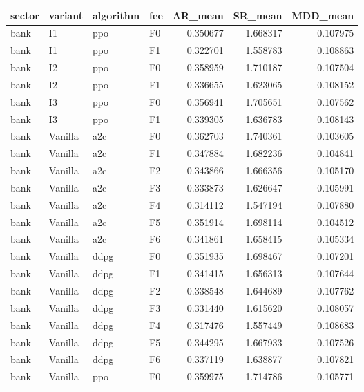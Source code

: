 \begin{tabular}{llllrrr}
\toprule
    sector & variant & algorithm & fee &   AR\_mean &   SR\_mean &  MDD\_mean \\
\midrule
      bank &      I1 &       ppo &  F0 &  0.350677 &  1.668317 &  0.107975 \\
      bank &      I1 &       ppo &  F1 &  0.322701 &  1.558783 &  0.108863 \\
      bank &      I2 &       ppo &  F0 &  0.358959 &  1.710187 &  0.107504 \\
      bank &      I2 &       ppo &  F1 &  0.336655 &  1.623065 &  0.108152 \\
      bank &      I3 &       ppo &  F0 &  0.356941 &  1.705651 &  0.107562 \\
      bank &      I3 &       ppo &  F1 &  0.339305 &  1.636783 &  0.108143 \\
      bank & Vanilla &       a2c &  F0 &  0.362703 &  1.740361 &  0.103605 \\
      bank & Vanilla &       a2c &  F1 &  0.347884 &  1.682236 &  0.104841 \\
      bank & Vanilla &       a2c &  F2 &  0.343866 &  1.666356 &  0.105170 \\
      bank & Vanilla &       a2c &  F3 &  0.333873 &  1.626647 &  0.105991 \\
      bank & Vanilla &       a2c &  F4 &  0.314112 &  1.547194 &  0.107880 \\
      bank & Vanilla &       a2c &  F5 &  0.351914 &  1.698114 &  0.104512 \\
      bank & Vanilla &       a2c &  F6 &  0.341861 &  1.658415 &  0.105334 \\
      bank & Vanilla &      ddpg &  F0 &  0.351935 &  1.698467 &  0.107201 \\
      bank & Vanilla &      ddpg &  F1 &  0.341415 &  1.656313 &  0.107644 \\
      bank & Vanilla &      ddpg &  F2 &  0.338548 &  1.644689 &  0.107762 \\
      bank & Vanilla &      ddpg &  F3 &  0.331440 &  1.615620 &  0.108057 \\
      bank & Vanilla &      ddpg &  F4 &  0.317476 &  1.557449 &  0.108683 \\
      bank & Vanilla &      ddpg &  F5 &  0.344295 &  1.667933 &  0.107526 \\
      bank & Vanilla &      ddpg &  F6 &  0.337119 &  1.638877 &  0.107821 \\
      bank & Vanilla &       ppo &  F0 &  0.359975 &  1.714786 &  0.105771 \\

\end{tabular}
